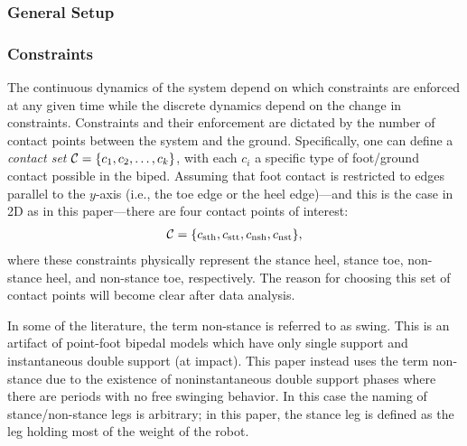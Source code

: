 

\subsubsection{General Setup}

\subsubsection{Constraints} The continuous dynamics of the system depend on which constraints are enforced at any given time while the discrete dynamics depend on the change in constraints.  Constraints and their enforcement are dictated by the number of contact points between the system and the ground. Specifically, one can define a {\em contact set} $\mathcal{C} = \{c_{1}, c_{2}, \ldots, c_{k}\}$, with each $c_i$ a specific type of foot/ground contact possible in the biped. Assuming that foot contact is restricted to edges parallel to the $y$-axis (i.e., the toe edge or the heel edge)---and this is the case in 2D as in this paper---there are four contact points of interest:
\begin{align}
  \mathcal{C} =  \{c_{\mathrm{sth}}, c_{\mathrm{stt}}, c_{\mathrm{nsh}} , c_{\mathrm{nst}}\},
\end{align}
where these constraints physically represent the stance heel, stance toe, non-stance heel, and non-stance toe, respectively. The reason for choosing this set of contact points will become clear after data analysis.

\begin{remark}
  In some of the literature, the term non-stance is referred to as swing. This is an artifact of point-foot bipedal models which have only single support and instantaneous double support (at impact). This paper instead uses the term non-stance due to the existence of noninstantaneous double support phases where there are periods with no free swinging behavior. In this case the naming of stance/non-stance legs is arbitrary; in this paper, the stance leg is defined as the leg holding most of the weight of the robot.
\end{remark}



